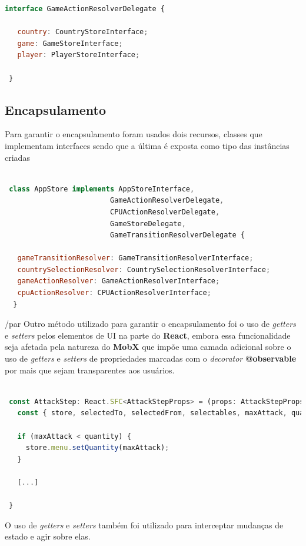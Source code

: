 \documentclass[rel_mlp]{iiufrgs}
\begin{document}
\begin{lstlisting}[language=JavaScript]
 interface GameActionResolverDelegate {

   country: CountryStoreInterface;
   game: GameStoreInterface;
   player: PlayerStoreInterface;

 }
\end{lstlisting}

\subsection{Encapsulamento}
Para garantir o encapsulamento foram usados dois recursos, classes que implementam interfaces sendo que a última é exposta como tipo das instâncias criadas

\begin{lstlisting}[language=JavaScript]

 class AppStore implements AppStoreInterface,
                         GameActionResolverDelegate,
                         CPUActionResolverDelegate,
                         GameStoreDelegate,
                         GameTransitionResolverDelegate {

   gameTransitionResolver: GameTransitionResolverInterface;
   countrySelectionResolver: CountrySelectionResolverInterface;
   gameActionResolver: GameActionResolverInterface;
   cpuActionResolver: CPUActionResolverInterface;
  }

\end{lstlisting}
/par
Outro método utilizado para garantir o encapsulamento foi o uso de \textit{getters} e \textit{setters} pelos elementos de UI na parte do \textbf{React}, embora essa funcionalidade seja afetada pela natureza do \textbf{MobX} que impõe uma camada adicional
sobre o uso de \textit{getters} e \textit{setters} de propriedades marcadas com o \textit{decorator} \textbf{@observable} por mais que sejam transparentes aos usuários.

\begin{lstlisting}[language=JavaScript]

 const AttackStep: React.SFC<AttackStepProps> = (props: AttackStepProps) => {
   const { store, selectedTo, selectedFrom, selectables, maxAttack, quantity } = props;

   if (maxAttack < quantity) {
     store.menu.setQuantity(maxAttack);
   }

   [...]

 }
\end{lstlisting}
\par
O uso de \textit{getters} e \textit{setters} também foi utilizado para interceptar mudanças de estado e agir sobre elas.
\end{document}
